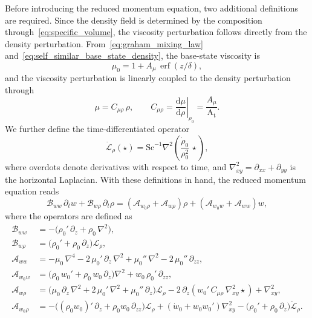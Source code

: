 \documentclass[11pt]{article}
\newcommand{\Atw}{\mathrm{A_t}}
\newcommand{\Sch}{\mathrm{Sc}}
\DeclareMathOperator{\erf}{erf}
\begin{document}
Before introducing the reduced momentum equation, two additional definitions are required. Since
the density field is determined by the composition through~\eqref{eq:specific_volume}, the viscosity perturbation follows directly from the density perturbation. From~\eqref{eq:graham_mixing_law} and~\eqref{eq:self_similar_base_state_density}, the
base-state viscosity is
\begin{equation}
    \mu_0 = 1 + A_{\mu}\,\erf\!\left(z/\delta\right),
\end{equation}
and the viscosity perturbation is linearly coupled to the density perturbation through
\begin{equation}
    \mu = C_{\mu\rho}\,\rho, \qquad
    C_{\mu\rho} = \left.\frac{\mathrm{d}\mu}{\mathrm{d}\rho}\right|_{\rho_0} = \frac{A_{\mu}}{\Atw}.
\end{equation}
We further define the time-differentiated operator
\begin{equation}
    \dot{\mathscr{L}}_\rho(\star)
    =
    \Sch^{-1}
    \nabla^2
    \left(
      \frac{\dot{\rho}_0}{\rho_0^{2}}\,\star
    \right),
\end{equation}
where overdots denote derivatives with respect to time, and
\(\nabla_{xy}^2 = \partial_{xx} + \partial_{yy}\) is the horizontal Laplacian. With these
definitions in hand, the reduced momentum equation reads
\begin{equation}
    \mathscr{B}_{ww}\,\partial_t w
    +
    \mathscr{B}_{w\rho}\,\partial_t \rho
    =
    \left(
      \mathscr{A}_{w_0 \rho}
      +
      \mathscr{A}_{w\rho}
    \right)\rho
    +
    \left(
      \mathscr{A}_{w_0 w}
      +
      \mathscr{A}_{ww}
    \right)w,
\end{equation}
where the operators are defined as
\begin{subequations}
\label{eq:A_B_operators}
\begin{align}
    \mathscr{B}_{ww} &= -\Big(\rho_0'\,\partial_z + \rho_0\,\nabla^2\Big), \\
    \mathscr{B}_{w\rho} &= \Big(\rho_0' + \rho_0\,\partial_z\Big)\mathscr{L}_{\rho}, \\
    \mathscr{A}_{ww} &= -\mu_0\,\nabla^4 - 2\,\mu_0'\,\partial_z\,\nabla^2 + \mu_0''\,\nabla^2 - 2\,\mu_0''\,\partial_{zz}, \\
    \mathscr{A}_{w_0 w} &= \Big(\rho_0\,w_0' + \rho_0\,w_0\,\partial_z\Big)\nabla^2 + w_0\,\rho_0'\,\partial_{zz}, \\
    \mathscr{A}_{w\rho} &= \Big(\mu_0\,\partial_z\,\nabla^2 + 2\,\mu_0'\,\nabla^2 + \mu_0''\,\partial_z\Big)\mathscr{L}_\rho - 2\,\partial_z\!\left(w_0'\,C_{\mu\rho}\,\nabla_{xy}^2\star\right) + \nabla_{xy}^2, \\
    \mathscr{A}_{w_0 \rho} &= -\Big((\rho_0 w_0)'\,\partial_z + \rho_0 w_0\,\partial_{zz}\Big)\mathscr{L}_{\rho} + \left(\dot{w}_0 + w_0 w_0'\right)\nabla_{xy}^2 - \Big(\rho_0' + \rho_0\,\partial_z\Big)\dot{\mathscr{L}}_{\rho}.
\end{align}
\end{subequations}
\end{document}
